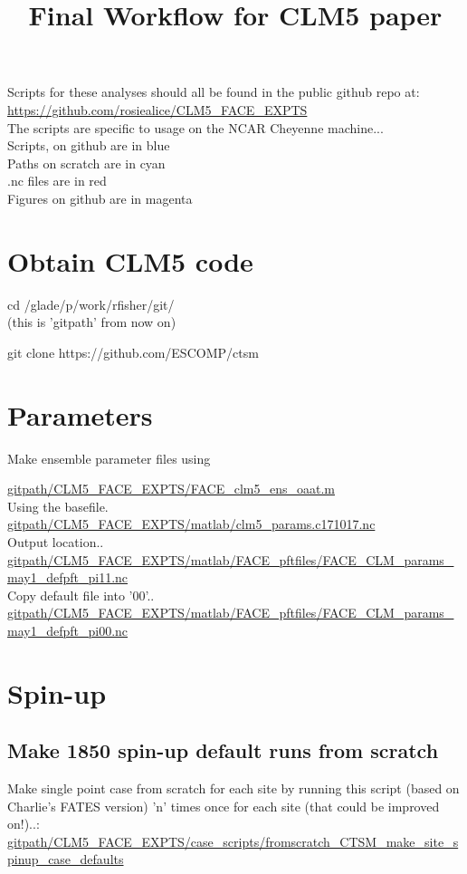 \documentclass{article}
\begin{document}
\title{Final Workflow for CLM5 paper}


Scripts for these analyses should all be found in the public github repo at:\\
{\color{blue}\small{\url{https://github.com/rosiealice/CLM5_FACE_EXPTS}}}\\

The scripts are specific to usage on the NCAR Cheyenne machine...\\

{\color{blue} Scripts, on github are in blue}\\
{\color{cyan} Paths on scratch are in cyan}\\
{\color{red}  .nc files are in red}\\
{\color{magenta} Figures on github are in magenta}\\

\section{Obtain CLM5 code}
cd /glade/p/work/rfisher/git/\\
(this is 'gitpath' from now on)

git clone https://github.com/ESCOMP/ctsm 
\section{Parameters}

Make ensemble parameter files using

{\color{blue}\small{\url{gitpath/CLM5_FACE_EXPTS/FACE_clm5_ens_oaat.m}}}\\ 

Using the basefile. \\
{\color{red}\small{\url{gitpath/CLM5_FACE_EXPTS/matlab/clm5_params.c171017.nc}}} \\

Output location..\\
{\color{red}\small{\url{gitpath/CLM5_FACE_EXPTS/matlab/FACE_pftfiles/FACE_CLM_params_may1_defpft_pi11.nc }}} \\

Copy default file into '00'..\\
{\color{red}\small{\url{gitpath/CLM5_FACE_EXPTS/matlab/FACE_pftfiles/FACE_CLM_params_may1_defpft_pi00.nc }}} \\

\section{Spin-up}
\subsection{Make 1850 spin-up default runs from scratch}
Make single point case from scratch for each site by running this script (based on Charlie's FATES version) 'n' times once for each site (that could be improved on!)..:\\
{\color{blue}\small{\url{gitpath/CLM5_FACE_EXPTS/case_scripts/fromscratch_CTSM_make_site_spinup_case_defaults}}}\\
\end{document}
